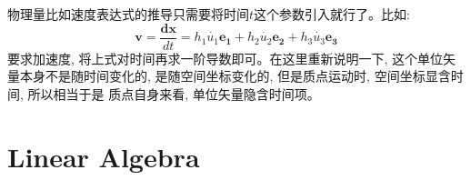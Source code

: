 物理量比如速度表达式的推导只需要将时间$t$这个参数引入就行了。比如:$$\bm{v}=\frac{\bm{dx}}{dt}=h_1\dot{u_1}\bm{e_1}+h_2\dot{u_2}\bm{e_2}+h_3\dot{u_3}\bm{e_3}$$
要求加速度, 将上式对时间再求一阶导数即可。在这里重新说明一下, 这个单位矢量本身不是随时间变化的, 是随空间坐标变化的, 但是质点运动时, 空间坐标显含时间, 所以相当于是
质点自身来看, 单位矢量隐含时间项。
\chapter{Linear Algebra}

